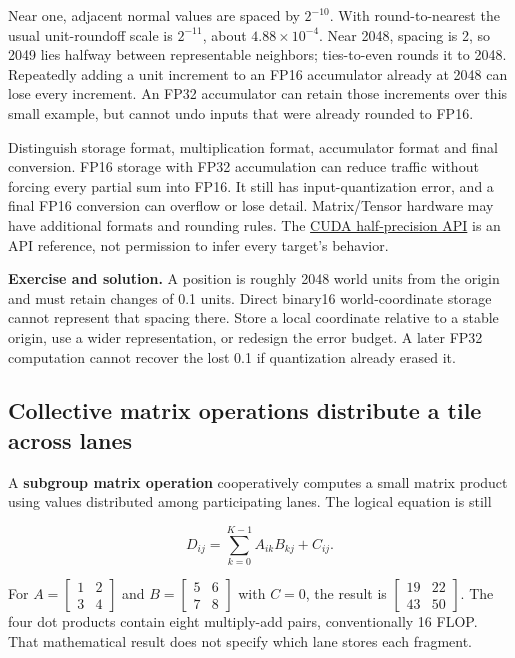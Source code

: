 Near one, adjacent normal values are spaced by \(2^{-10}\). With round-to-nearest the usual unit-roundoff scale is \(2^{-11}\), about \(4.88\times10^{-4}\). Near 2048, spacing is 2, so 2049 lies halfway between representable neighbors; ties-to-even rounds it to 2048. Repeatedly adding a unit increment to an FP16 accumulator already at 2048 can lose every increment. An FP32 accumulator can retain those increments over this small example, but cannot undo inputs that were already rounded to FP16.

Distinguish storage format, multiplication format, accumulator format and final conversion. FP16 storage with FP32 accumulation can reduce traffic without forcing every partial sum into FP16. It still has input-quantization error, and a final FP16 conversion can overflow or lose detail. Matrix/Tensor hardware may have additional formats and rounding rules. The \href{https://docs.nvidia.com/cuda/cuda-math-api/cuda_math_api/group__CUDA__MATH__INTRINSIC__HALF.html}{CUDA half-precision API} is an API reference, not permission to infer every target's behavior.

\textbf{Exercise and solution.} A position is roughly 2048 world units from the origin and must retain changes of 0.1 units. Direct binary16 world-coordinate storage cannot represent that spacing there. Store a local coordinate relative to a stable origin, use a wider representation, or redesign the error budget. A later FP32 computation cannot recover the lost 0.1 if quantization already erased it.

\subsection{Collective matrix operations distribute a tile across lanes}\label{03-visual-computing-i-ch016-collective-matrix-operations-distribute-a-tile-across-lanes}

A \textbf{subgroup matrix operation} cooperatively computes a small matrix product using values distributed among participating lanes. The logical equation is still

\[
D_{ij}=\sum_{k=0}^{K-1} A_{ik}B_{kj}+C_{ij}.
\]

For \(A=\begin{bmatrix}1&2\\3&4\end{bmatrix}\) and \(B=\begin{bmatrix}5&6\\7&8\end{bmatrix}\) with \(C=0\), the result is \(\begin{bmatrix}19&22\\43&50\end{bmatrix}\). The four dot products contain eight multiply-add pairs, conventionally 16 FLOP. That mathematical result does not specify which lane stores each fragment.

